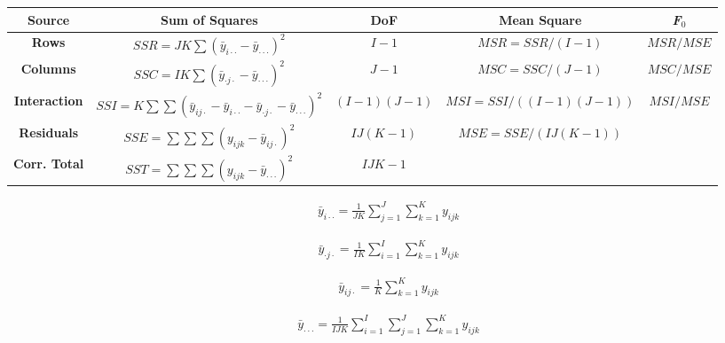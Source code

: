 \documentclass[12pt]{article}
\begin{document}
\pagestyle{empty}
\large
{}
\pagecolor{ehandbook}


\hspace{-1.75in}
\renewcommand*\arraystretch{1.5}
\begin{table}
\begin{tabular}{|c|c|c|c|c|} \hline 
{\bf Source}  & {\bf Sum of Squares} & {\bf DoF} & {\bf Mean Square} & {\bf \it{F}$_0$} \\ \hline
{\bf Rows}    & $SSR = JK\sum{{(\bar{y}_{i \cdot\cdot}-\bar{y}_{\cdot\cdot\cdot})}^2}$ & $I-1$ & $ MSR = SSR/(I-1)$  & $MSR/MSE$ \\ \hline
{\bf Columns} & $SSC = IK\sum{{(\bar{y}_{\cdot j \cdot} -\bar{y}_{\cdot\cdot\cdot} )}^2}$ & $J-1$ & $MSC = SSC / (J-1)$  & $MSC/MSE$ \\ \hline
{\bf Interaction} & $SSI = K\sum \sum{{(\bar{y}_{ij\cdot} - \bar{y}_{i\cdot\cdot} - \bar{y}_{\cdot j \cdot} - \bar{y}_{\cdot\cdot\cdot} )}}^2$ & $(I-1)(J-1)$ & $MSI = SSI / ((I-1)(J-1))$  & $MSI/MSE$ \\ \hline
{\bf Residuals} & $SSE = \sum \sum \sum{{(y_{ijk} - \bar{y}_{ij\cdot})^2}}$  & $IJ(K-1)$ & $ MSE = SSE / (IJ(K-1))$  & \\ \hline
{\bf Corr. Total} & $SST = \sum \sum \sum{{(y_{ijk} - \bar{y}_{\cdot\cdot\cdot})^2}} $ & $IJK-1$ & & \\ \hline
\end{tabular}
\end{table}

\vspace*{.5in} 

\begin{eqnarray*}
\bar{y}_{i \cdot \cdot} = \frac{1}{JK} \sum_{j=1}^{J}{\sum_{k=1}^{K}{{y_{ijk}}}}
\end{eqnarray*}

\begin{eqnarray*}
\bar{y}_{\cdot j \cdot} = \frac{1}{IK} \sum_{i=1}^{I}{\sum_{k=1}^{K}{{y_{ijk}}}}
\end{eqnarray*}

\begin{eqnarray*}
\bar{y}_{ij \cdot} =  \frac{1}{K} \sum_{k=1}^{K}{y_{ijk}}
\end{eqnarray*}

\begin{eqnarray*}
\bar{y}_{\cdot \cdot \cdot} = \frac{1}{IJK} \sum_{i=1}^{I}{\sum_{j=1}^{J}{\sum_{k=1}^{K}{{y_{ijk}}}}}
\end{eqnarray*}
\end{document}

